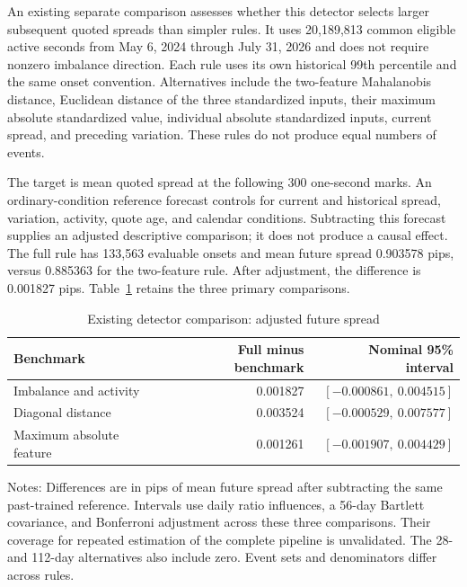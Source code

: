 \documentclass[12pt,letterpaper]{article}
\begin{document}
An existing separate comparison assesses whether this detector selects larger subsequent quoted spreads than simpler rules. It uses 20,189,813 common eligible active seconds from May 6, 2024 through July 31, 2026 and does not require nonzero imbalance direction. Each rule uses its own historical 99th percentile and the same onset convention. Alternatives include the two-feature Mahalanobis distance, Euclidean distance of the three standardized inputs, their maximum absolute standardized value, individual absolute standardized inputs, current spread, and preceding variation. These rules do not produce equal numbers of events.

The target is mean quoted spread at the following 300 one-second marks. An ordinary-condition reference forecast controls for current and historical spread, variation, activity, quote age, and calendar conditions. Subtracting this forecast supplies an adjusted descriptive comparison; it does not produce a causal effect. The full rule has 133,563 evaluable onsets and mean future spread 0.903578 pips, versus 0.885363 for the two-feature rule. After adjustment, the difference is 0.001827 pips. Table~\ref{tab:detector-check} retains the three primary comparisons.

\begin{table}[htbp]
\centering
\caption{Existing detector comparison: adjusted future spread}
\label{tab:detector-check}
\begin{tabular}{lrr}
\toprule
Benchmark & Full minus benchmark & Nominal 95\% interval\\
\midrule
Imbalance and activity & 0.001827 & $[-0.000861,\ 0.004515]$\\
Diagonal distance & 0.003524 & $[-0.000529,\ 0.007577]$\\
Maximum absolute feature & 0.001261 & $[-0.001907,\ 0.004429]$\\
\bottomrule
\end{tabular}

\smallskip
\begin{minipage}{0.96\linewidth}\footnotesize
Notes: Differences are in pips of mean future spread after subtracting the same past-trained reference. Intervals use daily ratio influences, a 56-day Bartlett covariance, and Bonferroni adjustment across these three comparisons. Their coverage for repeated estimation of the complete pipeline is unvalidated. The 28- and 112-day alternatives also include zero. Event sets and denominators differ across rules.
\end{minipage}
\end{table}
\end{document}
